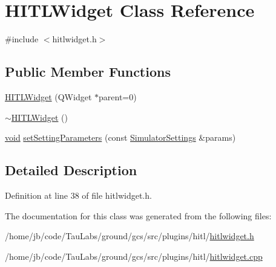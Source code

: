 \hypertarget{class_h_i_t_l_widget}{\section{\-H\-I\-T\-L\-Widget \-Class \-Reference}
\label{class_h_i_t_l_widget}
}


{\ttfamily \#include $<$hitlwidget.\-h$>$}

\subsection*{\-Public \-Member \-Functions}
\begin{DoxyCompactItemize}
\item 
\hyperlink{group___h_i_t_l_plugin_ga87da797826b0d587d7ed590e61741ca6}{\-H\-I\-T\-L\-Widget} (\-Q\-Widget $\ast$parent=0)
\item 
\hyperlink{group___h_i_t_l_plugin_gad53ecce8b7088bb11049d62819ff96f4}{$\sim$\-H\-I\-T\-L\-Widget} ()
\item 
\hyperlink{group___u_a_v_objects_plugin_ga444cf2ff3f0ecbe028adce838d373f5c}{void} \hyperlink{group___h_i_t_l_plugin_ga31d53f47fdb03b2ef1c879fa4e55ba53}{set\-Setting\-Parameters} (const \hyperlink{group___h_i_t_l_plugin_ga052199f1328d3002bce3e45345aa7f4e}{\-Simulator\-Settings} \&params)
\end{DoxyCompactItemize}


\subsection{\-Detailed \-Description}


\-Definition at line 38 of file hitlwidget.\-h.



\-The documentation for this class was generated from the following files\-:\begin{DoxyCompactItemize}
\item 
/home/jb/code/\-Tau\-Labs/ground/gcs/src/plugins/hitl/\hyperlink{hitlwidget_8h}{hitlwidget.\-h}\item 
/home/jb/code/\-Tau\-Labs/ground/gcs/src/plugins/hitl/\hyperlink{hitlwidget_8cpp}{hitlwidget.\-cpp}\end{DoxyCompactItemize}
